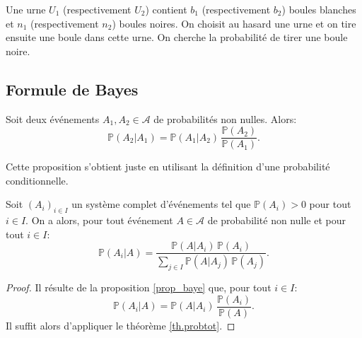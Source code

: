 \begin{exemple}
Une urne $U_1$ (respectivement $U_2$) contient $b_1$ (respectivement $b_2$) boules blanches et $n_1$ (respectivement $n_2$) boules noires. On choisit au hasard une urne et on tire ensuite une boule dans cette urne. On cherche la probabilité de tirer une boule noire.

\pl{\rep{4cm}}
\end{exemple}


\sld{\vfill\pagebreak[5]}%


\subsection{Formule de Bayes}

\begin{proposition}\label{prop_baye}
Soit deux événements $A_1, A_2 \in \mathcal{A}$ de probabilités non nulles. Alors:
\[
\mathbb{P}(A_2 | A_1) = \mathbb{P}(A_1 | A_2) \, \frac{\mathbb{P}(A_2)}{\mathbb{P}(A_1)}.  
\]
\end{proposition}

Cette proposition s'obtient juste en utilisant la définition d'une probabilité conditionnelle.
\sld{\vfill\pagebreak[5]}%


\begin{theorem}
Soit $(A_i)_{i \in I}$ un système complet d'événements tel que $\mathbb{P} (A_i) >0$ pour tout $i \in I$. On a alors, pour tout événement $A \in \mathcal{A}$ de probabilité non nulle et pour tout $i \in I$:
\[ \mathbb{P} (A_i | A) = \frac{\mathbb{P} (A | A_i) \, \mathbb{P} (A_i)}{\sum_{j \in I} \mathbb{P} (A | A_j) \, \mathbb{P} (A_j)} .\]
\end{theorem}


\begin{proof}
	Il résulte de la proposition \ref{prop_baye} que, pour tout $i \in I$:
	\[
		\mathbb{P}(A_i | A) = \mathbb{P}(A | A_i) \, \frac{\mathbb{P}(A_i)}{\mathbb{P}(A)}. 
	\]
	Il suffit alors d'appliquer le théorème \ref{th.probtot}. 
\end{proof}

